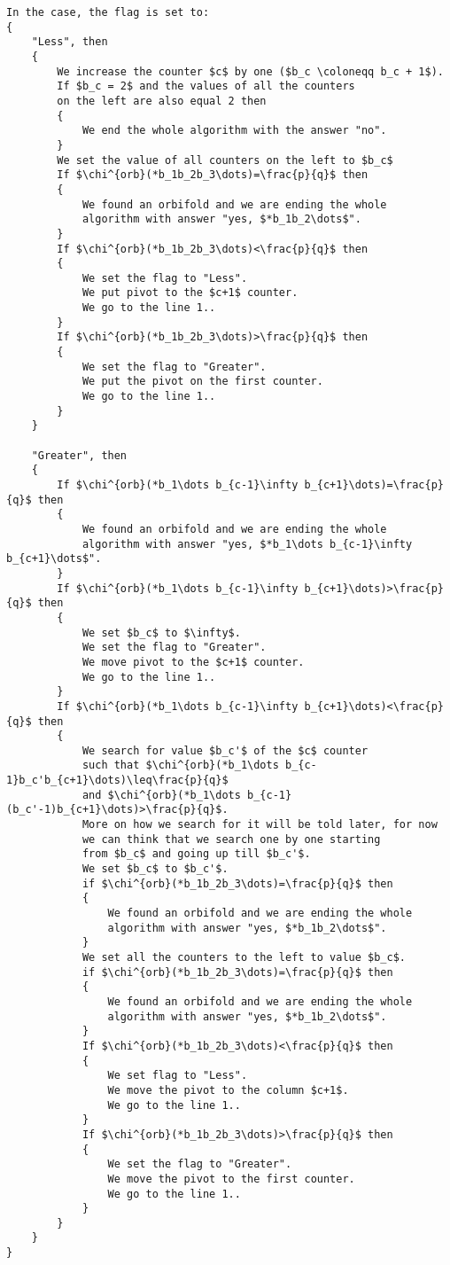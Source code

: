 \begin{lstlisting}[firstnumber=1,consecutivenumbers=true]
In the case, the flag is set to: 
{
    "Less", then 
    {
        We increase the counter $c$ by one ($b_c \coloneqq b_c + 1$).
        If $b_c = 2$ and the values of all the counters 
        on the left are also equal 2 then 
        {
            We end the whole algorithm with the answer "no".
        }
        We set the value of all counters on the left to $b_c$
        If $\chi^{orb}(*b_1b_2b_3\dots)=\frac{p}{q}$ then
        {
            We found an orbifold and we are ending the whole
            algorithm with answer "yes, $*b_1b_2\dots$".
        }
        If $\chi^{orb}(*b_1b_2b_3\dots)<\frac{p}{q}$ then
        {
            We set the flag to "Less".
            We put pivot to the $c+1$ counter.
            We go to the line 1..
        }
        If $\chi^{orb}(*b_1b_2b_3\dots)>\frac{p}{q}$ then  
        {
            We set the flag to "Greater".
            We put the pivot on the first counter. 
            We go to the line 1..
        }  
    }

    "Greater", then
    {
        If $\chi^{orb}(*b_1\dots b_{c-1}\infty b_{c+1}\dots)=\frac{p}{q}$ then
        {
            We found an orbifold and we are ending the whole
            algorithm with answer "yes, $*b_1\dots b_{c-1}\infty b_{c+1}\dots$".
        } 
        If $\chi^{orb}(*b_1\dots b_{c-1}\infty b_{c+1}\dots)>\frac{p}{q}$ then
        {
            We set $b_c$ to $\infty$.
            We set the flag to "Greater".
            We move pivot to the $c+1$ counter.
            We go to the line 1..
        }  
        If $\chi^{orb}(*b_1\dots b_{c-1}\infty b_{c+1}\dots)<\frac{p}{q}$ then
        {
            We search for value $b_c'$ of the $c$ counter 
            such that $\chi^{orb}(*b_1\dots b_{c-1}b_c'b_{c+1}\dots)\leq\frac{p}{q}$ 
            and $\chi^{orb}(*b_1\dots b_{c-1}(b_c'-1)b_{c+1}\dots)>\frac{p}{q}$.
            More on how we search for it will be told later, for now  
            we can think that we search one by one starting 
            from $b_c$ and going up till $b_c'$.
            We set $b_c$ to $b_c'$.
            if $\chi^{orb}(*b_1b_2b_3\dots)=\frac{p}{q}$ then 
            {
                We found an orbifold and we are ending the whole
                algorithm with answer "yes, $*b_1b_2\dots$".
            }
            We set all the counters to the left to value $b_c$.
            if $\chi^{orb}(*b_1b_2b_3\dots)=\frac{p}{q}$ then 
            {
                We found an orbifold and we are ending the whole
                algorithm with answer "yes, $*b_1b_2\dots$".
            }
            If $\chi^{orb}(*b_1b_2b_3\dots)<\frac{p}{q}$ then 
            {
                We set flag to "Less".
                We move the pivot to the column $c+1$.
                We go to the line 1..
            }
            If $\chi^{orb}(*b_1b_2b_3\dots)>\frac{p}{q}$ then 
            {
                We set the flag to "Greater".
                We move the pivot to the first counter.
                We go to the line 1..
            }
        }  
    }
}
\end{lstlisting}
